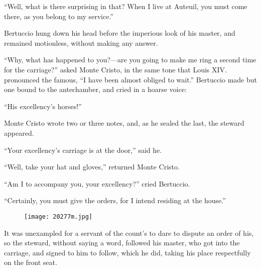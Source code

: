 “Well, what is there surprising in that? When I live at Auteuil, you
must come there, as you belong to my service.”

Bertuccio hung down his head before the imperious look of his master,
and remained motionless, without making any answer.

“Why, what has happened to you?—are you going to make me ring a second
time for the carriage?” asked Monte Cristo, in the same tone that Louis
XIV. pronounced the famous, “I have been almost obliged to wait.”
Bertuccio made but one bound to the antechamber, and cried in a hoarse
voice:

“His excellency’s horses!”

Monte Cristo wrote two or three notes, and, as he sealed the last, the
steward appeared.

“Your excellency’s carriage is at the door,” said he.

“Well, take your hat and gloves,” returned Monte Cristo.

“Am I to accompany you, your excellency?” cried Bertuccio.

“Certainly, you must give the orders, for I intend residing at the
house.”

\begin{figure}[ht]
\texttt{[image: 20277m.jpg]}
\end{figure}

It was unexampled for a servant of the count’s to dare to dispute an
order of his, so the steward, without saying a word, followed his
master, who got into the carriage, and signed to him to follow, which
he did, taking his place respectfully on the front seat.
